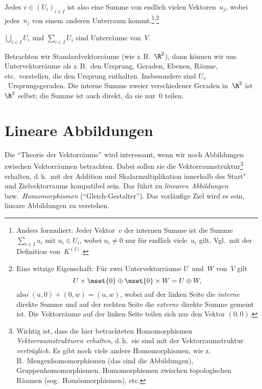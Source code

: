 \documentclass[a4paper]{article}
\begin{document}
Jedes $v \in (U_i)_{i\in I}$ ist also eine Summe von endlich vielen Vektoren~$u_j$, wobei jedes~$u_j$ von einem anderen Unterraum kommt.\footnote{Anders formuliert: Jeder Vektor~$v$ der internen Summe ist die Summe $\sum_{i\in I} u_i$ mit $u_i \in U_i$, wobei $u_i \neq 0$ nur für endlich viele~$u_i$ gilt. Vgl.\ mit der Definition von~$K^{(I)}$.}\textsuperscript{,}\footnote{Eine witzige Eigenschaft: Für zwei Untervektorräume $U$~und~$W$ von~$V$ gilt
    \begin{equation*}
        U\times\mset{0} \oplus \mset{0}\times W = U \oplus W,
    \end{equation*}
    also $(u, 0) + (0,w) = (u,w)$, wobei auf der linken Seite die \emph{interne} direkte Summe und auf der rechten Seite die \emph{externe} direkte Summe gemeint ist. Die Vektorräume auf der linken Seite teilen sich nur den Vektor $(0, 0)$.}

\begin{lemma}
    $\bigcup_{i\in I} U_i$ und $\sum_{i\in I} U_i$ sind Unterräume von~$V$.
\end{lemma}

Betrachten wir Standardvektorräume (wie z.\,B.~$\R^2$), dann können wir uns Untervektorräume als z.\,B.\ den Ursprung, Geraden, Ebenen, Räume, etc.\ vorstellen, die den Ursprung enthalten. Insbesondere sind $U_v$~Ursprungsgeraden. Die interne Summe zweier verschiedener Geraden in~$\R^2$ ist~$\R^2$ selbst; die Summe ist auch direkt, da sie nur~$0$ teilen.

\section{Lineare Abbildungen}

Die "`Theorie der Vektorräume"' wird interessant, wenn wir noch Abbildungen zwischen Vektorräumen betrachten. Dabei sollen sie die Vektorraumstruktur\footnote{Wichtig ist, dass die hier betrachteten Homomorphismen \emph{Vektorraumstrukturen erhalten}, d.\,h.\ sie sind mit der Vektorraumstruktur \emph{verträglich}. Es gibt noch viele andere Homomorphismen, wie z.\,B.\ Mengenhomomorphismen (das sind die Abbildungen), Gruppenhomomorphismen, Homomorphismen zwischen topologischen Räumen (sog.\ Homöomorphismen), etc.} erhalten, d.\,h.\ mit der Addition und Skalarmultiplikation innerhalb des Start"~ und Zielvektorraums kompatibel sein. Das führt zu \emph{linearen Abbildungen} bzw.\ \emph{Homomorphismen} ("`Gleich-Gestalter"'). Das vorläufige Ziel wird es sein, lineare Abbildungen zu verstehen.
\end{document}
